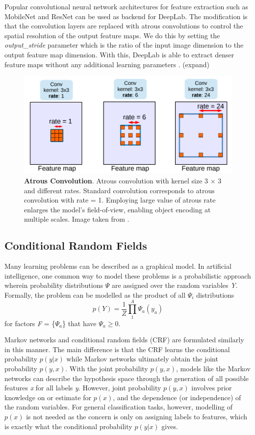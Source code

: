 \documentclass[10pt, journal, compsoc]{IEEEtran}
\begin{document}
Popular convolutional neural network architectures for feature extraction such as MobileNet and ResNet can be used as backend for DeepLab. The modification is that the convolution layers are replaced with atrous convolutions to control the spatial resolution of the output feature maps. We do this by setting the \textit{output\_stride} parameter which is the ratio of the input image dimension to the output feature map dimension. With this, DeepLab is able to extract denser feature maps without any additional learning parameters \cite{DBLP:journals/corr/ChenPSA17}.
(expand)
\begin{figure}
\includegraphics[width=\linewidth]{atrous_conv.png}
\caption{\textbf{Atrous Convolution}. Atrous convolution with kernel size 3 × 3 and different rates. Standard convolution corresponds to atrous convolution
with rate = 1. Employing large value of atrous rate enlarges the
model’s field-of-view, enabling object encoding at multiple scales. Image taken from \cite{DBLP:journals/corr/ChenPSA17}.}
\label{fig:deeplab_atrous_conv}
\end{figure}
\subsection{Conditional Random Fields}
Many learning problems can be described as a graphical model. In artificial intelligence, one common way to model these problems is a probabilistic approach wherein probability distributions \textit{$\Psi$} are assigned over the random variables \textit{Y}. Formally, the problem can be modelled as the product of all \textit{$\Psi_i$} distributions
\begin{equation}
p(Y) = \frac{1}{Z}\prod_1^A \Psi_a(y_a)
\end{equation}
for factors \textit{F} = \{$\Psi_a$\} that have $\Psi_a \geq 0$. 
 
Markov networks and conditional random fields (CRF) are formulated similarly in this manner. The main difference is that the CRF learns the conditional probability $p(y|x)$ while Markov networks ultimately obtain the joint probability $p(y,x)$. With the joint probability $p(y,x)$, models like the Markov networks can describe the hypothesis space through the generation of all possible features \textit{x} for all labels \textit{y}. However, joint probability $p(y,x)$ involves prior knowledge on or estimate for $p(x)$, and the dependence (or independence) of the random variables. For general classification tasks, however, modelling of $p(x)$ is not needed as the concern is only on assigning labels to features, which is exactly what the conditional probability $p(y|x)$ gives.
\end{document}
